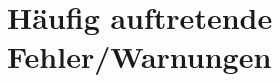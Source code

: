 \documentclass[12pt]{article}
\begin{document}
\section{Häufig auftretende Fehler/Warnungen}

\clearpage
\frontmatter%
\renewcommand{\plaintitle}{Literaturverzeichnis}
\setcounter{page}{5}
\printMyBibliography
\end{document}
